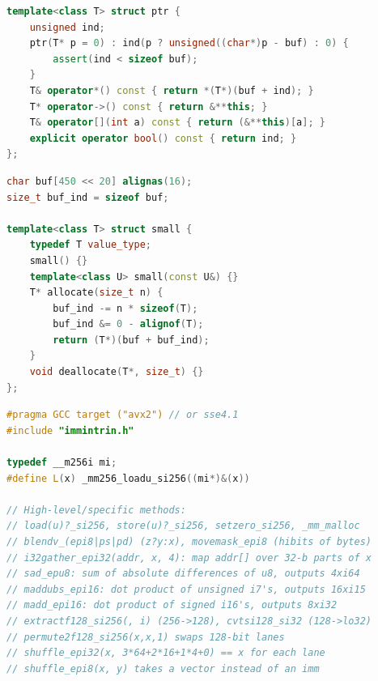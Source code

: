 \begin{multicols}{\Columns}
\begin{lstlisting}[language=C++]
template<class T> struct ptr {
	unsigned ind;
	ptr(T* p = 0) : ind(p ? unsigned((char*)p - buf) : 0) {
		assert(ind < sizeof buf);
	}
	T& operator*() const { return *(T*)(buf + ind); }
	T* operator->() const { return &**this; }
	T& operator[](int a) const { return (&**this)[a]; }
	explicit operator bool() const { return ind; }
};
\end{lstlisting}

\begin{lstlisting}[language=C++]
char buf[450 << 20] alignas(16);
size_t buf_ind = sizeof buf;

template<class T> struct small {
	typedef T value_type;
	small() {}
	template<class U> small(const U&) {}
	T* allocate(size_t n) {
		buf_ind -= n * sizeof(T);
		buf_ind &= 0 - alignof(T);
		return (T*)(buf + buf_ind);
	}
	void deallocate(T*, size_t) {}
};
\end{lstlisting}

\begin{lstlisting}[language=C++]
#pragma GCC target ("avx2") // or sse4.1
#include "immintrin.h"

typedef __m256i mi;
#define L(x) _mm256_loadu_si256((mi*)&(x))

// High-level/specific methods:
// load(u)?_si256, store(u)?_si256, setzero_si256, _mm_malloc
// blendv_(epi8|ps|pd) (z?y:x), movemask_epi8 (hibits of bytes)
// i32gather_epi32(addr, x, 4): map addr[] over 32-b parts of x
// sad_epu8: sum of absolute differences of u8, outputs 4xi64
// maddubs_epi16: dot product of unsigned i7's, outputs 16xi15
// madd_epi16: dot product of signed i16's, outputs 8xi32
// extractf128_si256(, i) (256->128), cvtsi128_si32 (128->lo32)
// permute2f128_si256(x,x,1) swaps 128-bit lanes
// shuffle_epi32(x, 3*64+2*16+1*4+0) == x for each lane
// shuffle_epi8(x, y) takes a vector instead of an imm


\end{lstlisting}
\end{multicols}
